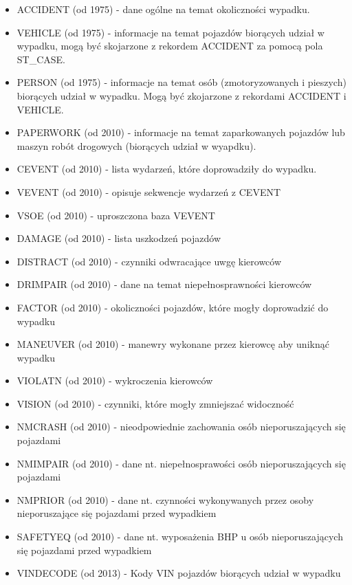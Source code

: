 \begin{itemize}
\itemsep1pt\parskip0pt
\item
  ACCIDENT (od 1975) - dane ogólne na temat okoliczności wypadku.\\
\item
  VEHICLE (od 1975) - informacje na temat pojazdów biorących udział w
  wypadku, mogą być skojarzone z rekordem ACCIDENT za pomocą pola
  ST\_CASE.\\
\item
  PERSON (od 1975) - informacje na temat osób (zmotoryzowanych i
  pieszych) biorących udział w wypadku. Mogą być zkojarzone z rekordami
  ACCIDENT i VEHICLE.\\
\item
  PAPERWORK (od 2010) - informacje na temat zaparkowanych pojazdów lub
  maszyn robót drogowych (biorących udział w wyapdku).\\
\item
  CEVENT (od 2010) - lista wydarzeń, które doprowadziły do wypadku.\\
\item
  VEVENT (od 2010) - opisuje sekwencje wydarzeń z CEVENT\\
\item
  VSOE (od 2010) - uproszczona baza VEVENT\\
\item
  DAMAGE (od 2010) - lista uszkodzeń pojazdów\\
\item
  DISTRACT (od 2010) - czynniki odwracające uwgę kierowców\\
\item
  DRIMPAIR (od 2010) - dane na temat niepełnosprawności kierowców\\
\item
  FACTOR (od 2010) - okoliczności pojazdów, które mogły doprowadzić do
  wypadku\\
\item
  MANEUVER (od 2010) - manewry wykonane przez kierowcę aby uniknąć
  wypadku\\
\item
  VIOLATN (od 2010) - wykroczenia kierowców\\
\item
  VISION (od 2010) - czynniki, które mogły zmniejszać widoczność\\
\item
  NMCRASH (od 2010) - nieodpowiednie zachowania osób nieporuszających
  się pojazdami\\
\item
  NMIMPAIR (od 2010) - dane nt. niepełnosprawości osób nieporuszających
  się pojazdami\\
\item
  NMPRIOR (od 2010) - dane nt. czynności wykonywanych przez osoby
  nieporuszające się pojazdami przed wypadkiem\\
\item
  SAFETYEQ (od 2010) - dane nt. wyposażenia BHP u osób nieporuszających
  się pojazdami przed wypadkiem\\
\item
  VINDECODE (od 2013) - Kody VIN pojazdów biorących udział w wypadku
\end{itemize}

